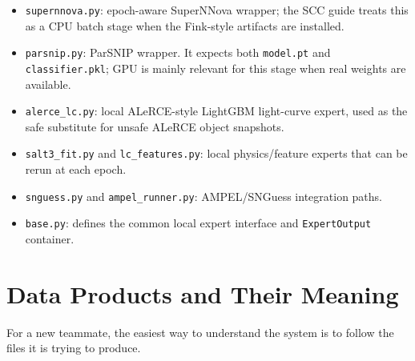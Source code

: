 \documentclass[11pt]{article}
\newcommand{\code}[1]{\texttt{#1}}
\begin{document}
\begin{itemize}
\item \code{supernnova.py}: epoch-aware SuperNNova wrapper; the SCC guide treats this as a CPU batch stage when the Fink-style artifacts are installed.
\item \code{parsnip.py}: ParSNIP wrapper. It expects both \code{model.pt} and \code{classifier.pkl}; GPU is mainly relevant for this stage when real weights are available.
\item \code{alerce\_lc.py}: local ALeRCE-style LightGBM light-curve expert, used as the safe substitute for unsafe ALeRCE object snapshots.
\item \code{salt3\_fit.py} and \code{lc\_features.py}: local physics/feature experts that can be rerun at each epoch.
\item \code{snguess.py} and \code{ampel\_runner.py}: AMPEL/SNGuess integration paths.
\item \code{base.py}: defines the common local expert interface and \code{ExpertOutput} container.
\end{itemize}

\section{Data Products and Their Meaning}

For a new teammate, the easiest way to understand the system is to follow the files it is trying to produce.
\end{document}
